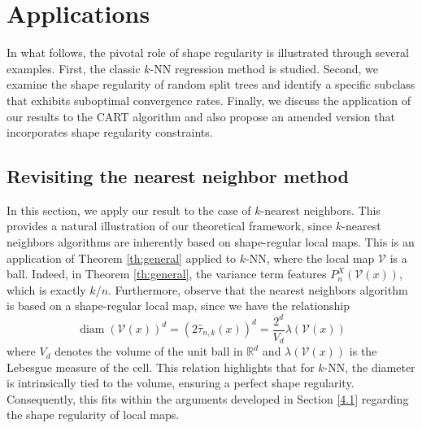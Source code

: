\documentclass[paper=a4, fontsize=11pt]{scrartcl}
\newcommand{\diam}{\operatorname{diam}}
\begin{document}
\section{Applications}\label{s_appli}

In what follows, the pivotal role of shape regularity is illustrated through several examples. First, the classic $k$-NN regression method is studied. Second, we examine the shape regularity of random split trees and identify a specific subclass that exhibits suboptimal convergence rates. Finally, we discuss the application of our results to the CART algorithm and also propose an amended version that incorporates shape regularity constraints.



\subsection{Revisiting the nearest neighbor method}\label{sec_k_nn}





In this section, we apply our result to the case of $k$-nearest neighbors. This provides a natural illustration of our theoretical framework, since $k$-nearest neighbors algorithms are inherently based on shape-regular local maps. This is an application of Theorem \ref{th:general} applied to $k$-NN, where the local map $\mathcal{V}$ is a ball. Indeed, in Theorem \ref{th:general}, the variance term features $P_n^X(\mathcal{V}(x))$, which is exactly $k/n$. Furthermore, observe that the nearest neighbors algorithm is based on a shape-regular local map, since we have the relationship $$\diam(\mathcal{V}(x))^d = (2 \hat \tau _{n,k}(x))^d = \dfrac{2^d}{V_d} \lambda(\mathcal{V}(x))$$
where $V_d$ denotes the volume of the unit ball in $\mathbb{R}^d$ and $\lambda(\mathcal{V}(x))$ is the Lebesgue measure of the cell. This relation highlights that for $k$-NN, the diameter is intrinsically tied to the volume, ensuring a perfect shape regularity. Consequently, this fits within the arguments developed in Section \ref{4.1} regarding the shape regularity of local maps.
\end{document}
